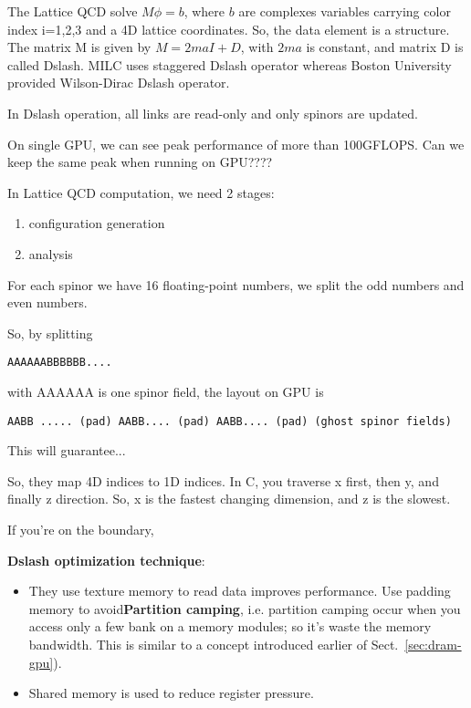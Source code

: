 The Lattice QCD solve $M\phi=b$, where $b$ are complexes variables
carrying color index i=1,2,3 and a 4D lattice coordinates. So, the
data element is a structure. The matrix M is given by $M=2maI+D$, with
$2ma$ is constant, and matrix D is called Dslash.
MILC uses staggered Dslash operator whereas Boston University provided
Wilson-Dirac Dslash operator. %

In Dslash operation, all links are read-only and only spinors are
updated. 

On single GPU, we can see peak performance of more than 100GFLOPS. Can
we keep the same peak when running on GPU???? 

In Lattice QCD computation, we need 2 stages:
\begin{enumerate}
\item configuration generation
\item analysis
\end{enumerate}


For each spinor we have 16 floating-point numbers, we split the odd
numbers and even numbers. 

So, by splitting
\begin{verbatim}
AAAAAABBBBBB....
\end{verbatim}
with AAAAAA is one spinor field, the layout on GPU is
\begin{verbatim}
AABB ..... (pad) AABB.... (pad) AABB.... (pad) (ghost spinor fields)
\end{verbatim}
This will guarantee...


So, they map 4D indices to 1D indices. In C, you traverse x first,
then y, and finally z direction. So, x is the fastest changing
dimension, and z is the slowest. 


If you're on the boundary, 


{\bf Dslash optimization technique}: 
\begin{itemize}
\item They use texture memory to read data improves performance.  Use
  padding memory to avoid{\bf Partition camping}, i.e. partition
  camping occur when you access only a few bank on a memory modules;
  so it's waste the memory bandwidth. This is similar to a concept
  introduced earlier of Sect.~\ref{sec:dram-gpu}).

\item Shared memory is used to reduce register pressure. 
\end{itemize}

